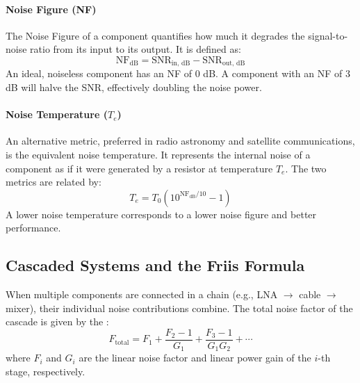 \paragraph{Noise Figure (NF)}
The Noise Figure of a component quantifies how much it degrades the signal-to-noise ratio from its input to its output. It is defined as:
\begin{equation}
    \text{NF}_{\text{dB}} = \text{SNR}_{\text{in, dB}} - \text{SNR}_{\text{out, dB}}
\end{equation}
An ideal, noiseless component has an NF of 0 dB. A component with an NF of 3 dB will halve the SNR, effectively doubling the noise power.

\paragraph{Noise Temperature ($T_e$)}
An alternative metric, preferred in radio astronomy and satellite communications, is the equivalent noise temperature. It represents the internal noise of a component as if it were generated by a resistor at temperature $T_e$. The two metrics are related by:
\begin{equation}
    T_e = T_0 (10^{\text{NF}_{\text{dB}}/10} - 1)
\end{equation}
A lower noise temperature corresponds to a lower noise figure and better performance.


\subsection{Cascaded Systems and the Friis Formula}

When multiple components are connected in a chain (e.g., LNA $\rightarrow$ cable $\rightarrow$ mixer), their individual noise contributions combine. The total noise factor of the cascade is given by the :
\begin{equation}
    F_{\text{total}} = F_1 + \frac{F_2 - 1}{G_1} + \frac{F_3 - 1}{G_1 G_2} + \cdots
\end{equation}
where $F_i$ and $G_i$ are the linear noise factor and linear power gain of the $i$-th stage, respectively.

